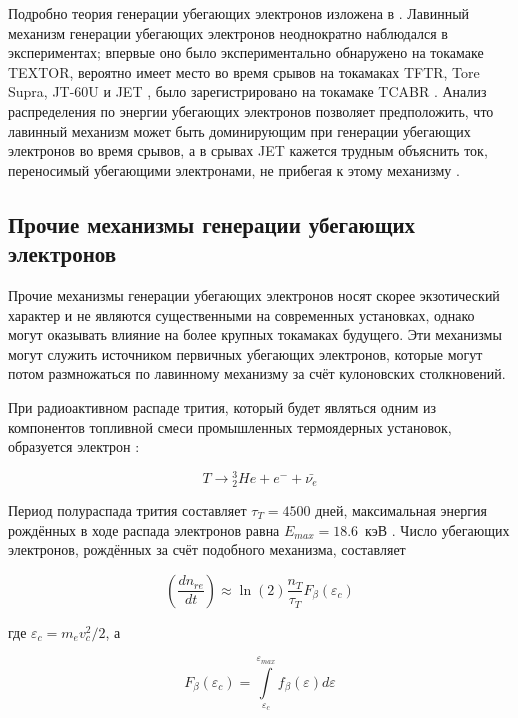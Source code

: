 Подробно теория генерации убегающих электронов изложена в \cite{Rosenbluth1997}. Лавинный механизм генерации убегающих электронов неоднократно наблюдался в экспериментах; впервые оно было экспериментально обнаружено на токамаке TEXTOR, вероятно имеет место во время срывов на токамаках TFTR, Tore Supra, JT-60U и JET \cite{Gill2002,Helander2002}, было зарегистрировано на токамаке TCABR \cite{Galvao2001}. Анализ распределения по энергии убегающих электронов позволяет предположить, что лавинный механизм может быть доминирующим при генерации убегающих электронов во время срывов, а в срывах JET кажется трудным объяснить ток, переносимый убегающими электронами, не прибегая к этому механизму \cite{Helander2002}.

\subsection{Прочие механизмы генерации убегающих электронов}

Прочие механизмы генерации убегающих электронов носят скорее экзотический характер и не являются существенными на современных установках, однако могут оказывать влияние на более крупных токамаках будущего. Эти механизмы могут служить источником первичных убегающих электронов, которые могут потом размножаться по лавинному механизму за счёт кулоновских столкновений.

При радиоактивном распаде трития, который будет являться одним из компонентов топливной смеси промышленных термоядерных установок, образуется электрон \cite{Burrows1990}:

\begin{equation*}
  T \rightarrow {}^3_2 He + e^{-} + \bar{ \nu_e }
\end{equation*}

Период полураспада трития составляет $ \tau_T = 4500 $ дней, максимальная энергия рождённых в ходе распада электронов равна $ E_{max} = 18.6$~кэВ \cite{MartinSolis2017}. Число убегающих электронов, рождённых за счёт подобного механизма, составляет

\begin{equation*}
  \left( \frac{ d n_{re} }{ d t } \right) \approx \ln(2) \frac{ n_T }{ \tau_T } F_{\beta}(\varepsilon_c)
\end{equation*}

где $\varepsilon_c = m_e v_c^2 / 2$, а 

\begin{equation*}
  F_{\beta}(\varepsilon_c) = \int\limits_{\varepsilon_c}^{ \varepsilon_{max} } f_{\beta}(\varepsilon) d\varepsilon 
\end{equation*}

